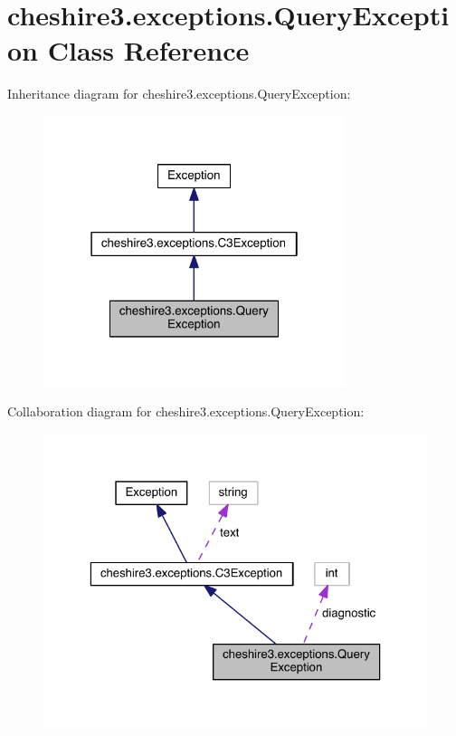 \hypertarget{classcheshire3_1_1exceptions_1_1_query_exception}{\section{cheshire3.\-exceptions.\-Query\-Exception Class Reference}
\label{classcheshire3_1_1exceptions_1_1_query_exception}
}


Inheritance diagram for cheshire3.\-exceptions.\-Query\-Exception\-:
\nopagebreak
\begin{figure}[H]
\begin{center}
\leavevmode
\includegraphics[width=250pt]{classcheshire3_1_1exceptions_1_1_query_exception__inherit__graph}
\end{center}
\end{figure}


Collaboration diagram for cheshire3.\-exceptions.\-Query\-Exception\-:
\nopagebreak
\begin{figure}[H]
\begin{center}
\leavevmode
\includegraphics[width=323pt]{classcheshire3_1_1exceptions_1_1_query_exception__coll__graph}
\end{center}
\end{figure}
